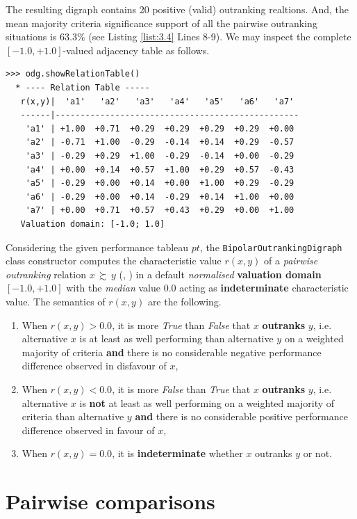 The resulting digraph contains 20 positive (valid) outranking realtions. And, the mean majority criteria significance support of all the pairwise outranking situations is $63.3\%$ (see Listing \ref{list:3.4}  Lines 8-9). We may inspect the complete $[-1.0,+1.0]$-valued adjacency table as follows.
 \begin{lstlisting}[caption={Inspecting the valued adjacency table},label=list:3.5]
>>> odg.showRelationTable()
  * ---- Relation Table -----
   r(x,y)|  'a1'   'a2'   'a3'   'a4'   'a5'   'a6'   'a7'   
   ------|-------------------------------------------------
    'a1' | +1.00  +0.71  +0.29  +0.29  +0.29  +0.29  +0.00  
    'a2' | -0.71  +1.00  -0.29  -0.14  +0.14  +0.29  -0.57  
    'a3' | -0.29  +0.29  +1.00  -0.29  -0.14  +0.00  -0.29  
    'a4' | +0.00  +0.14  +0.57  +1.00  +0.29  +0.57  -0.43  
    'a5' | -0.29  +0.00  +0.14  +0.00  +1.00  +0.29  -0.29  
    'a6' | -0.29  +0.00  +0.14  -0.29  +0.14  +1.00  +0.00  
    'a7' | +0.00  +0.71  +0.57  +0.43  +0.29  +0.00  +1.00  
   Valuation domain: [-1.0; 1.0]
\end{lstlisting}

Considering the given performance tableau $pt$, the \texttt{BipolarOutrankingDigraph} class constructor computes the characteristic value $r(x,y)$ of a \emph{pairwise outranking} relation $x\, \succsim \,y$ (\cite{BIS-2013}, \cite{ADT-L7}) in a default {\em normalised\/} {\bf valuation domain} $[-1.0,+1.0]$ with the {\em median\/} value $0.0$ acting as {\bf indeterminate} characteristic value. The semantics of $r(x,y)$ are the following.
\begin{enumerate}
\item When $r(x,y) > 0.0$, it is more {\em True\/} than {\em False\/} that $x$ {\bf outranks} $y$, i.e. alternative $x$ is at least as well performing than alternative $y$ on a weighted majority of criteria {\bf and} there is no considerable negative performance difference observed in disfavour of $x$,
\item When $r(x,y) < 0.0$, it is more {\em False\/} than {\em True\/} that $x$ {\bf outranks} $y$, i.e. alternative $x$ is {\bf not} at least as well performing on a weighted majority of criteria than alternative $y$ {\bf and} there is no considerable positive performance difference observed in favour of $x$,
\item When $r(x,y) = 0.0$, it is {\bf indeterminate} whether $x$ outranks $y$ or not.
\end{enumerate}

\section{Pairwise comparisons}
\label{sec:3.3}

